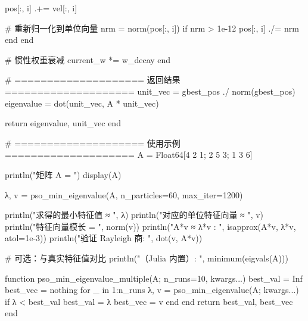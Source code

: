 \begin{jllisting}[language={julia}, caption={PSO求解矩阵特征值及其单位特征向量}, label=code:grok]
            pos[:, i] .+= vel[:, i]

            # 重新归一化到单位向量
            nrm = norm(pos[:, i])
            if nrm > 1e-12
                pos[:, i] ./= nrm
            end
        end

        # 惯性权重衰减
        current_w *= w_decay
    end

    # ==================== 返回结果 ====================
    unit_vec = gbest_pos ./ norm(gbest_pos)
    eigenvalue = dot(unit_vec, A * unit_vec)

    return eigenvalue, unit_vec
end


# ==================== 使用示例 ====================
A = Float64[4 2 1; 2 5 3; 1 3 6]

println("矩阵 A = ")
display(A)

λ, v = pso_min_eigenvalue(A, n_particles=60, max_iter=1200)

println("\nPSO 求得的最小特征值 ≈ ", λ)
println("对应的单位特征向量 ≈ ", v)
println("特征向量模长 = ", norm(v))
println(" A*v ≈ λ*v : ", isapprox(A*v, λ*v, atol=1e-3))
println("验证 Rayleigh 商: ", dot(v, A*v))

# 可选：与真实特征值对比
println("（Julia 内置）: ", minimum(eigvals(A)))
\end{jllisting}

\begin{jllisting}[language={julia}, caption={PSO求解矩阵特征值及其单位特征向量}, label=code:grok1]
function pso_min_eigenvalue_multiple(A; n_runs=10, kwargs...)
    best_val = Inf
    best_vec = nothing
    for _ in 1:n_runs
        λ, v = pso_min_eigenvalue(A; kwargs...)
        if λ < best_val
            best_val = λ
            best_vec = v
        end
    end
    return best_val, best_vec
end
\end{jllisting}